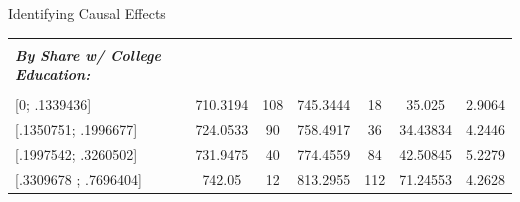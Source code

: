 \documentclass[notes,10pt, aspectratio=169]{beamer}
\begin{document}
\begin{frame}{Identifying Causal Effects}
\begin{center}
{\begin{tabular}{l|cc|cc|cc|}
            \multicolumn{1}{|l|}{} &                                                                &                                &                                                                &                                & \multicolumn{1}{c|}{}                                             &                      \\
            \multicolumn{1}{|l|}{\textbf{\textit{By Share w/ College Education:}}} &                                                                &                                &                                                                &                                & \multicolumn{1}{c|}{}                                             &                      \\
            \multicolumn{1}{|l|}{} &                                                                &                                &                                                                &                                & \multicolumn{1}{c|}{}                                             &                      \\
            \multicolumn{1}{|l|}{{[}0; .1339436{]}}                       & 710.3194                                                       & 108                            & 745.3444                                                       & 18                             & \multicolumn{1}{c|}{35.025}                                       & 2.9064               \\
            \multicolumn{1}{|l|}{{[}.1350751; .1996677{]}}                & 724.0533                                                       & 90                             & 758.4917                                                       & 36                             & \multicolumn{1}{c|}{34.43834}                                     & 4.2446               \\
            \multicolumn{1}{|l|}{{[}.1997542; .3260502{]}}                & 731.9475                                                       & 40                             & 774.4559                                                       & 84                             & \multicolumn{1}{c|}{42.50845}                                     & 5.2279               \\
            \multicolumn{1}{|l|}{{[}.3309678 ; .7696404{]}}               & 742.05                                                         & 12                             & 813.2955                                                       & 112                            & \multicolumn{1}{c|}{71.24553}                                     & 4.2628               \\ \hline
            \end{tabular}
            
}

\end{center}

\end{frame}
\end{document}
